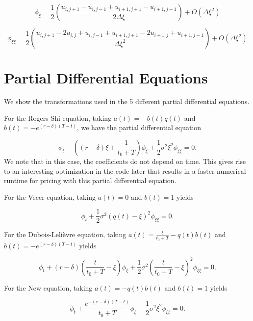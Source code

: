 \documentclass{article}
\begin{document}
\begin{equation}
  \phi_\xi = \frac{1}{2}(\frac{u_{i, j+1} - u_{i,j-1} +u_{i+1, j+1} - u_{i+1, j-1}}{2\Delta\xi}) + O(\Delta\xi^2)
\end{equation}

\begin{equation}
  \phi_{\xi\xi} = \frac{1}{2}(\frac{u_{i, j+1} - 2u_{i, j} + u_{i, j-1} + u_{i + 1, j+1} - 2 u_{i+1, j} + u_{i+1, j-1}}{\Delta\xi^2}) + O(\Delta\xi^2)
\end{equation}

\section{Partial Differential Equations}
We show the transformations used in the 5 different partial differential equations.

For the Rogers-Shi equation, taking \(a(t)\) = \(-b(t)q(t)\) and \(b(t) = -e^{(r-\delta)(T-t)}\), we have the partial differential equation

\begin{equation}
  \phi_t - ( (r-\delta)\xi + \frac{1}{t_0 + T} )\phi_\xi + \frac{1}{2}\sigma^2\xi^2\phi_{\xi\xi} = 0.
\end{equation}We note that in this case, the coefficients do not depend on time. This gives rise to an interesting optimization in the code later that results in a faster numerical runtime for pricing with this partial differential equation.

For the Vecer equation, taking \(a(t) = 0\) and \(b(t)=1\) yields

\begin{equation}
  \phi_t + \frac{1}{2}\sigma^2(q(t) - \xi)^2\phi_{\xi\xi} = 0.
\end{equation}

For the Dubois-Leli\`{e}vre equation, taking \(a(t) = \frac{t}{t_0 + T} - q(t)b(t)\) and \(b(t)=-e^{(r-\delta)(T-t)}\) yields

\begin{equation}
  \phi_t + (r-\delta)(\frac{t}{t_0 + T} - \xi)\phi_\xi + \frac{1}{2}\sigma^2(\frac{t}{t_0 + T} - \xi)^2\phi_{\xi\xi} = 0.
\end{equation}

For the New equation, taking \(a(t) = -q(t)b(t)\) and \(b(t) = 1\) yields

\begin{equation}
  \phi_t + \frac{e^{-(r-\delta)(T-t)}}{t_0 + T}\phi_\xi + \frac{1}{2}\sigma^2\xi^2\phi_{\xi\xi} = 0.
\end{equation}
\end{document}
